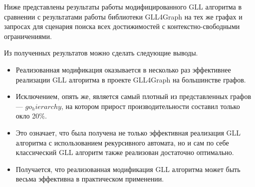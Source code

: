 Ниже представлены результаты работы модифицированного GLL алгоритма в сравнении с результатами работы библиотеки GLL4Graph на тех же графах и запросах для сценария поиска всех достижимостей с контекстно-свободными ограничениями.



Из полученных результатов можно сделать следующие выводы.
\begin{itemize}
    \item Реализованная модификация оказывается в несколько раз эффективнее реализации GLL алгоритма в проекте GLL4Graph на большинстве графов.
    \item Исключением, опять же, является самый плотный из представленных графов --- $go_hierarchy$, на котором прирост производительности составил только окло 20\%.
    \item Это означает, что была получена не только эффективная реализация GLL алгоритма с использованием рекурсивного автомата, но и сам по себе классический GLL алгоритм также реализован достаточно оптимально. 
    \item Получается, что реализованная модификация GLL алгоритма может быть весьма эффективна в практическом применении.
\end{itemize}


 
